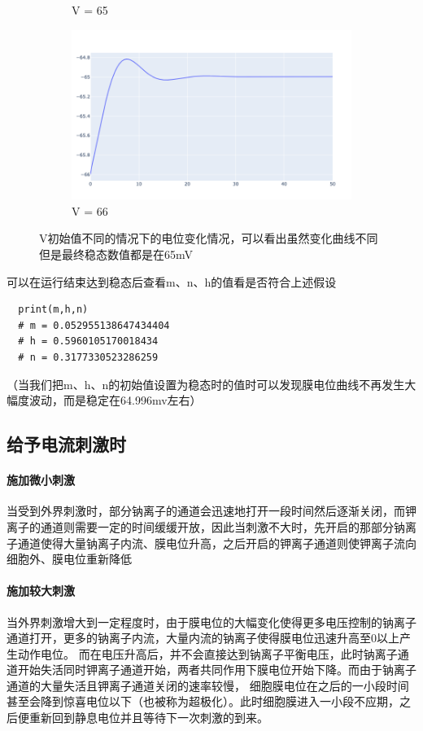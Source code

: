 \documentclass[nols, a4paper]{tufte-handout}
\begin{document}
\begin{figure}[htbp]
\begin{subfigure}[t]{0.32\linewidth}
        \caption{V = 65}
        \label{fig:sub2}
    \end{subfigure}
    \hfill
    \begin{subfigure}[t]{0.32\linewidth}
        \centering
        \includegraphics[width=\linewidth]{image/v66.png}
        \caption{V = 66}
        \label{fig:sub3}
    \end{subfigure}
    \caption{V初始值不同的情况下的电位变化情况，可以看出虽然变化曲线不同但是最终稳态数值都是在65mV}
    \label{fig:all}
\end{figure}

可以在运行结束达到稳态后查看m、n、h的值看是否符合上述假设
\begin{lstlisting}
  print(m,h,n)
  # m = 0.052955138647434404
  # h = 0.5960105170018434
  # n = 0.3177330523286259
\end{lstlisting}
（当我们把m、h、n的初始值设置为稳态时的值时可以发现膜电位曲线不再发生大幅度波动，而是稳定在64.996mv左右）

\subsection{给予电流刺激时}
\paragraph{施加微小刺激}
当受到外界刺激时，部分钠离子的通道会迅速地打开一段时间然后逐渐关闭，而钾离子的通道则需要一定的时间缓缓开放，因此当刺激不大时，先开启的那部分钠离子通道使得大量钠离子内流、膜电位升高，之后开启的钾离子通道则使钾离子流向细胞外、膜电位重新降低

\paragraph{施加较大刺激}
当外界刺激增大到一定程度时，由于膜电位的大幅变化使得更多电压控制的钠离子通道打开，更多的钠离子内流，大量内流的钠离子使得膜电位迅速升高至0以上产生动作电位。
而在电压升高后，并不会直接达到钠离子平衡电压，此时钠离子通道开始失活同时钾离子通道开始，两者共同作用下膜电位开始下降。而由于钠离子通道的大量失活且钾离子通道关闭的速率较慢，
细胞膜电位在之后的一小段时间甚至会降到惊喜电位以下（也被称为超极化）。此时细胞膜进入一小段不应期，之后便重新回到静息电位并且等待下一次刺激的到来。
\end{document}

